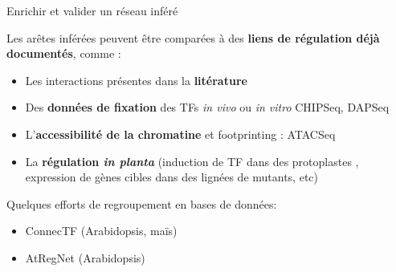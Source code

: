 \begin{frame}{Enrichir et valider un réseau inféré}


\small Les arêtes inférées peuvent être comparées à des \textbf{liens de régulation déjà documentés}, comme :


\begin{itemize} \small 
    \item Les interactions présentes dans la \textbf{litérature}
    \item Des \textbf{données de fixation} des TFs  \textit{in vivo} ou \textit{in vitro} CHIPSeq, DAPSeq
    \item L'\textbf{accessibilité de la chromatine} et footprinting : ATACSeq
    \item La \textbf{régulation \textit{in planta}} (induction de TF dans des protoplastes \cite{Bargmann2013}, expression de gènes cibles dans des lignées de mutants, etc) 
\end{itemize}
\vspace{-0.3cm}
\begin{block}{\small Quelques efforts de regroupement en bases de données:}
\begin{itemize}\small
    \item ConnecTF \cite{Brooks2020} (Arabidopsis, maïs)
    \item AtRegNet \cite{Palaniswamy2006} (Arabidopsis)
\end{itemize}
\end{block}
\end{frame}



